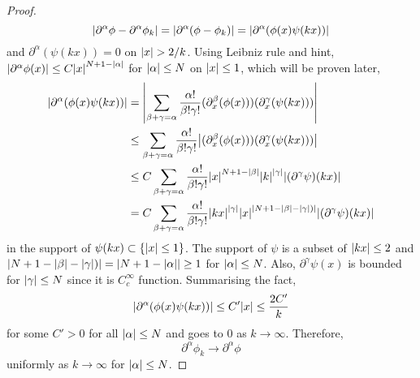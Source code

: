 \documentclass{article}
\begin{document}
\begin{enumerate}
\begin{proof}
\begin{equation*}
\abs{\partial^\alpha\phi-\partial^\alpha\phi_k}=\abs{\partial^\alpha(\phi-\phi_k)}=\abs{\partial^\alpha(\phi(x)\psi(kx))}
\end{equation*}
and $\partial^\alpha(\psi(kx))=0$ on $\abs{x}> 2/k$. Using Leibniz rule and hint, $\abs{\partial^\alpha \phi(x)}\leq C\abs{x}^{N+1-\abs{\alpha}}$ for $\abs{\alpha}\leq N$ on $\abs{x}\leq 1$, which will be proven later,
\begin{equation*}
\begin{split}
\abs{\partial^\alpha(\phi(x)\psi(kx))}&=\abs{\sum\limits_{\beta+\gamma=\alpha}\frac{\alpha!}{\beta!\gamma!}(\partial_x^\beta (\phi(x)))(\partial_x^\gamma (\psi(kx)))} \\
&\leq \sum\limits_{\beta+\gamma=\alpha}\frac{\alpha!}{\beta!\gamma!}\abs{(\partial_x^\beta (\phi(x)))(\partial_x^\gamma (\psi(kx)))} \\
&\leq C\sum\limits_{\beta+\gamma=\alpha}\frac{\alpha!}{\beta!\gamma!}\abs{x}^{N+1-\abs{\beta}} \abs{k}^\abs{\gamma}\abs{(\partial^\gamma\psi)(kx)} \\
&=C\sum\limits_{\beta+\gamma=\alpha}\frac{\alpha!}{\beta!\gamma!}\abs{kx}^{\abs{\gamma}} \abs{x}^\abs{N+1-\abs{\beta}-\abs{\gamma})}\abs{(\partial^\gamma\psi)(kx)}
\end{split}
\end{equation*}
in the support of $\psi(kx)\subset \{\abs{x}\leq 1\}$. The support of $\psi$ is a subset of $\abs{kx}\leq 2$ and $\abs{N+1-\abs{\beta}-\abs{\gamma})}=\abs{N+1-\abs{\alpha}}\geq 1$ for $\abs{\alpha}\leq N$. Also, $\partial^\gamma\psi(x)$ is bounded for $\abs{\gamma}\leq N$ since it is $C_c^\infty$ function. Summarising the fact,
\begin{equation*}
\abs{\partial^\alpha(\phi(x)\psi(kx))}\leq C'\abs{x}\leq \frac{2C'}{k}
\end{equation*}
for some $C'>0$ for all $\abs{\alpha}\leq N$ and goes to $0$ as $k\rightarrow\infty$. Therefore,
\begin{equation*}
\partial^\alpha\phi_k\rightarrow\partial^\alpha\phi
\end{equation*}
uniformly as $k\rightarrow \infty$ for $\abs{\alpha}\leq N$.


\end{proof}
\end{enumerate}
\end{document}
